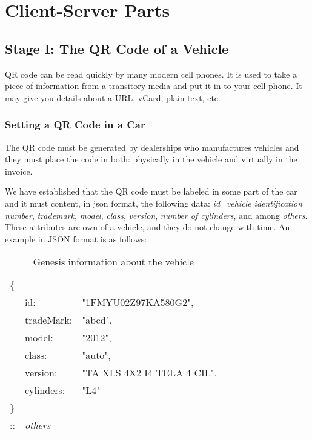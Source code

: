 \section{Client-Server Parts}
\label{sec:client}
\subsection{Stage I: The QR Code of a Vehicle}
\label{ssec:qrcode}
QR code can be read quickly by many modern cell phones. It is used to take a piece of information from a 
transitory media and put it in to your cell phone. It may give you details about a URL, vCard, plain text, etc.

\subsubsection{Setting a QR Code in a Car}
\label{sssec:settingQR}
The QR code must be generated by dealerships who manufactures vehicles and they must place the code
in both: physically in the vehicle and virtually in the invoice.

We have established that the QR code must be labeled in some part of the car and it must content,  
in json format, the following data: 
\textit{id=vehicle identification number}, 
\textit{trademark}, 
\textit{model}, 
\textit{class}, 
\textit{version}, 
\textit{number of cylinders}, and
among \textit{others}. These attributes are own of a vehicle, and they do not 
change with time. An example in JSON format is as follows:
\begin{table}[h]
    \centering
    \caption{Genesis information about the vehicle}
    \begin{tabular}{lll}
       \{&         			&    							\\
         & id:        		& "1FMYU02Z97KA580G2", 			\\
         & tradeMark: 		& "abcd", 						\\
         & model:     		& "2012", 						\\
         & class:     		& "auto", 						\\
         & version:   		& "TA XLS 4X2 I4 TELA 4 CIL", 	\\
         & cylinders: 		& "L4" 							\\
       \}& 		        	& 								\\
       ::& \textit{others}	&								\\
    \end{tabular}
    \label{table:genesisInfo}
\end{table}

